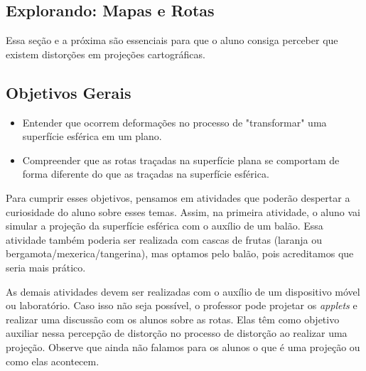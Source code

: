\cleardoublepage

\def\currentcolor{session1}
\begin{texto}{
\section{Explorando: Mapas e Rotas}

Essa seção e a próxima são essenciais para que o aluno consiga perceber que existem distorções em projeções cartográficas.

\subsection{Objetivos Gerais}

\begin{itemize}
\item Entender que ocorrem deformações no processo de "transformar" uma superfície esférica em um plano.

\item Compreender que as rotas traçadas na superfície plana se comportam de forma diferente do que as traçadas na superfície esférica.
\end{itemize}

Para cumprir esses objetivos, pensamos em atividades que poderão despertar a curiosidade do aluno sobre esses temas. Assim, na primeira atividade, o aluno vai simular a projeção da superfície esférica com o auxílio de um balão. Essa atividade também poderia ser realizada com cascas de frutas (laranja ou bergamota/mexerica/tangerina), mas optamos pelo balão, pois acreditamos que seria mais prático.

As demais atividades devem ser realizadas com o auxílio de um dispositivo móvel ou laboratório. Caso isso não seja possível, o professor pode projetar os \textit{applets} e realizar uma discussão com os alunos sobre as rotas. Elas têm como objetivo auxiliar nessa percepção de distorção no processo de distorção ao realizar uma projeção. Observe que ainda não falamos para os alunos o que é uma projeção ou como elas acontecem.
}
\end{texto}

